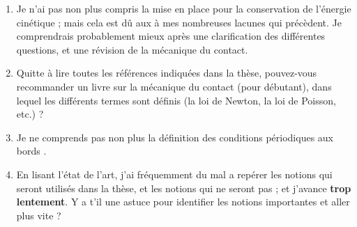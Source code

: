 \documentclass[
  french,
	11pt, %
]{fphw}
\begin{document}
\begin{enumerate}
  \item Je n'ai pas non plus compris la mise en place pour la conservation de l’énergie cinétique ; mais cela est dû aux à mes nombreuses lacunes qui précèdent. Je comprendrais probablement mieux après une clarification des différentes questions, et une révision de la mécanique du contact.

  \item Quitte à lire toutes les références indiquées dans la thèse, pouvez-vous recommander un livre sur la mécanique du contact (pour débutant), dans lequel les différents termes sont définis (la loi de Newton, la loi de Poisson, etc.) ?
  
  \item Je ne comprends pas non plus la définition des conditions périodiques aux bords \parencite[p.44]{rabatel2015thesis}.

  \item En lisant l'état de l'art, j'ai fréquemment du mal a repérer les notions qui seront utilisés dans la thèse, et les notions qui ne seront pas ; et j'avance \textbf{trop lentement}. Y a t'il une astuce pour identifier les notions importantes et aller plus vite ?
\end{enumerate}








\clearpage   %
\printbibliography
\end{document}
